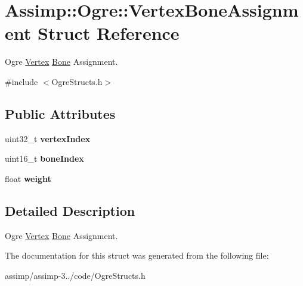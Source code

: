 \hypertarget{struct_assimp_1_1_ogre_1_1_vertex_bone_assignment}{\section{Assimp\+:\+:Ogre\+:\+:Vertex\+Bone\+Assignment Struct Reference}
\label{struct_assimp_1_1_ogre_1_1_vertex_bone_assignment}
}


Ogre \hyperlink{class_assimp_1_1_vertex}{Vertex} \hyperlink{class_assimp_1_1_ogre_1_1_bone}{Bone} Assignment.  




{\ttfamily \#include $<$Ogre\+Structs.\+h$>$}

\subsection*{Public Attributes}
\begin{DoxyCompactItemize}
\item 
\hypertarget{struct_assimp_1_1_ogre_1_1_vertex_bone_assignment_a94838afccdda4b699912997367c82ce5}{uint32\+\_\+t {\bfseries vertex\+Index}}\label{struct_assimp_1_1_ogre_1_1_vertex_bone_assignment_a94838afccdda4b699912997367c82ce5}

\item 
\hypertarget{struct_assimp_1_1_ogre_1_1_vertex_bone_assignment_a4e85adc706a8fc380ccb385338e6e099}{uint16\+\_\+t {\bfseries bone\+Index}}\label{struct_assimp_1_1_ogre_1_1_vertex_bone_assignment_a4e85adc706a8fc380ccb385338e6e099}

\item 
\hypertarget{struct_assimp_1_1_ogre_1_1_vertex_bone_assignment_aa8ee03713061b71ddeeda0880434cf7d}{float {\bfseries weight}}\label{struct_assimp_1_1_ogre_1_1_vertex_bone_assignment_aa8ee03713061b71ddeeda0880434cf7d}

\end{DoxyCompactItemize}


\subsection{Detailed Description}
Ogre \hyperlink{class_assimp_1_1_vertex}{Vertex} \hyperlink{class_assimp_1_1_ogre_1_1_bone}{Bone} Assignment. 

The documentation for this struct was generated from the following file\+:\begin{DoxyCompactItemize}
\item 
assimp/assimp-\/3../code/Ogre\+Structs.\+h\end{DoxyCompactItemize}

